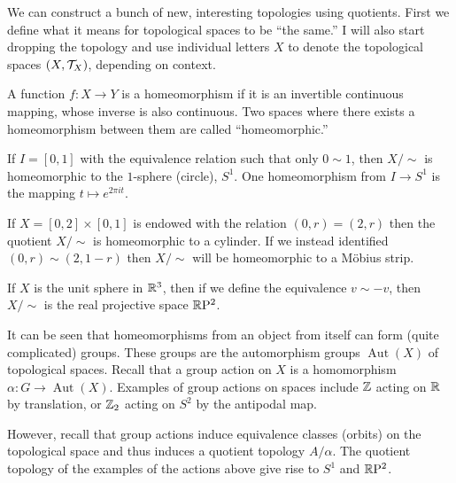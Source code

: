 We can construct a bunch of new, interesting topologies using quotients. First we define what it means for topological spaces to be ``the same.'' I will also start dropping the topology and use individual letters $X$ to denote the topological spaces $(X, \mathcal T_X)$, depending on context.

\begin{definition}[Homeomorphism]
    A function $f \colon X \to Y$ is a homeomorphism if it is an invertible continuous mapping, whose inverse is also continuous. Two spaces where there exists a homeomorphism between them are called ``homeomorphic.'' 
\end{definition}

\begin{example}[Circle]
    If $I = [0, 1]$ with the equivalence relation such that only $0 \sim 1$, then $X/\!\sim$ is homeomorphic to the $1$-sphere (circle), $S^1$. One homeomorphism from $I \to S^1$ is the mapping $t \mapsto e^{2\pi i t}.$
\end{example}

\begin{example}
    If $X = [0, 2] \times [0, 1]$ is endowed with the relation $(0, r) = (2, r)$ then the quotient $X/\!\sim$ is homeomorphic to a cylinder. If we instead identified $(0, r) \sim (2, 1 - r)$ then $X/\!\sim$ will be homeomorphic to a M\"obius strip.
\end{example}

\begin{example}
    If $X$ is the unit sphere in $\mathbb R^3$, then if we define the equivalence $v \sim -v$, then $X/\!\sim$ is the real projective space $\mathbb R\mathrm P^2$.
\end{example}

\begin{example}
    It can be seen that homeomorphisms from an object from itself can form (quite complicated) groups. These groups are the automorphism groups $\operatorname{Aut}(X)$ of topological spaces. Recall that a group action on $X$ is a homomorphism $\alpha \colon G \to \operatorname{Aut}(X)$. Examples of group actions on spaces include $\mathbb Z$ acting on $\mathbb R$ by translation, or $\mathbb Z_2$ acting on $S^2$ by the antipodal map. 

    However, recall that group actions induce equivalence classes (orbits) on the topological space and thus induces a quotient topology $A/\alpha$. The quotient topology of the examples of the actions above give rise to $S^1$ and $\mathbb R \mathrm P^2$.
\end{example}


